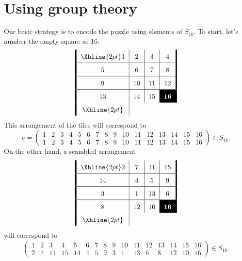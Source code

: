 \documentclass{ximera}
\begin{document}
\section{Using group theory}

Our basic strategy is to encode the puzzle using elements of $S_{16}$.
To start, let's number the empty square as $16$:
\[
\arraycolsep=6pt\def\arraystretch{1.6}
\begin{array}{!{\vline width 2pt}c|c|c|c!{\vline width 2pt}}
    \Xhline{2pt}
    1  & 2  & 3  & 4 \\ \hline
    5  & 6  & 7  & 8 \\ \hline
    9  & 10 & 11 & 12 \\ \hline
    13 & 14 & 15 & \cellcolor{black}\textcolor{white}{\textbf{16}} \\
    \Xhline{2pt}
\end{array}
\]
This arrangement of the tiles will correspond to
\[
e = \left(\begin{smallmatrix}
  1 & 2 & 3 & 4 & 5 & 6 & 7 & 8 & 9 & 10 & 11 & 12 & 13 & 14 & 15 & 16\\
  1 & 2 & 3 & 4 & 5 & 6 & 7 & 8 & 9 & 10 & 11 & 12 & 13 & 14 & 15 & 16
\end{smallmatrix}\right)\in S_{16}.
\]
On the other hand, a scambled arrangement 
\[
\arraycolsep=6pt\def\arraystretch{1.6}
\begin{array}{!{\vline width 2pt}c|c|c|c!{\vline width 2pt}}
    \Xhline{2pt}
    2 & 7  & 11 & 15\\ \hline
    14 & 4  & 5  & 9 \\ \hline
    3  & 1  & 13 & 6  \\ \hline
    8  & 12 & 10 & \cellcolor{black}\textcolor{white}{\textbf{16}} \\
    \Xhline{2pt}
\end{array}
\]
will correspond to
\[
\left(\begin{smallmatrix}
  1 & 2 & 3 & 4 & 5 & 6 & 7 & 8 & 9 & 10 & 11 & 12 & 13 & 14 & 15 & 16\\
  2 & 7 & 11& 15& 14& 4 & 5 & 9 & 3 & 1  & 13 &  6 &  8 & 12 & 10 & 16
\end{smallmatrix}\right)\in S_{16}.
\]
\end{document}
